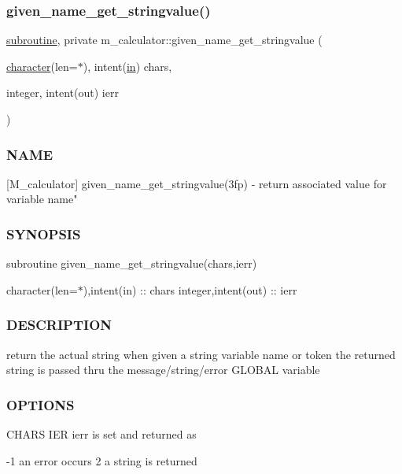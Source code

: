 \subsubsection{\texorpdfstring{given\+\_\+name\+\_\+get\+\_\+stringvalue()}{given\_name\_get\_stringvalue()}}
{\footnotesize\ttfamily \hyperlink{M__stopwatch_83_8txt_acfbcff50169d691ff02d4a123ed70482}{subroutine}, private m\+\_\+calculator\+::given\+\_\+name\+\_\+get\+\_\+stringvalue (\begin{DoxyParamCaption}\item[{\hyperlink{option__stopwatch_83_8txt_abd4b21fbbd175834027b5224bfe97e66}{character}(len=$\ast$), intent(\hyperlink{M__journal_83_8txt_afce72651d1eed785a2132bee863b2f38}{in})}]{chars,  }\item[{integer, intent(out)}]{ierr }\end{DoxyParamCaption})\hspace{0.3cm}{\ttfamily [private]}}



\subsubsection*{N\+A\+ME}

\mbox{[}M\+\_\+calculator\mbox{]} given\+\_\+name\+\_\+get\+\_\+stringvalue(3fp) -\/ return associated value for variable name" \subsubsection*{S\+Y\+N\+O\+P\+S\+IS}

subroutine given\+\_\+name\+\_\+get\+\_\+stringvalue(chars,ierr)

character(len=$\ast$),intent(in) \+:\+: chars integer,intent(out) \+:\+: ierr \subsubsection*{D\+E\+S\+C\+R\+I\+P\+T\+I\+ON}

return the actual string when given a string variable name or token the returned string is passed thru the message/string/error G\+L\+O\+B\+AL variable \subsubsection*{O\+P\+T\+I\+O\+NS}

C\+H\+A\+RS I\+ER ierr is set and returned as \begin{DoxyVerb}      -1  an error occurs
       2  a string is returned
\end{DoxyVerb}
